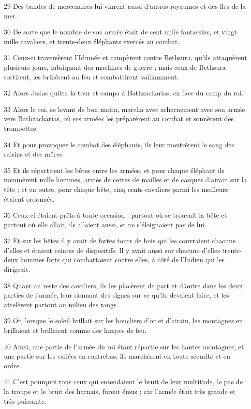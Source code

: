 \par 29 Des bandes de mercenaires lui vinrent aussi d'autres royaumes et des îles de la mer.
\par 30 De sorte que le nombre de son armée était de cent mille fantassins, et vingt mille cavaliers, et trente-deux éléphants exercés au combat.
\par 31 Ceux-ci traversèrent l'Idumée et campèrent contre Bethsura, qu'ils attaquèrent plusieurs jours, fabriquant des machines de guerre ; mais ceux de Bethsura sortirent, les brûlèrent au feu et combattirent vaillamment.
\par 32 Alors Judas quitta la tour et campa à Bathzacharias, en face du camp du roi.
\par 33 Alors le roi, se levant de bon matin, marcha avec acharnement avec son armée vers Bathzacharias, où ses armées les préparèrent au combat et sonnèrent des trompettes.
\par 34 Et pour provoquer le combat des éléphants, ils leur montrèrent le sang des raisins et des mûres.
\par 35 Et ils répartirent les bêtes entre les armées, et pour chaque éléphant ils nommèrent mille hommes, armés de cottes de mailles et de casques d'airain sur la tête ; et en outre, pour chaque bête, cinq cents cavaliers parmi les meilleurs étaient ordonnés.
\par 36 Ceux-ci étaient prêts à toute occasion : partout où se trouvait la bête et partout où elle allait, ils allaient aussi, et ne s'éloignaient pas de lui.
\par 37 Et sur les bêtes il y avait de fortes tours de bois qui les couvraient chacune d'elles et étaient ceintes de dispositifs. Il y avait aussi sur chacune d'elles trente-deux hommes forts qui combattaient contre elles, à côté de l'Indien qui les dirigeait.
\par 38 Quant au reste des cavaliers, ils les placèrent de part et d'autre dans les deux parties de l'armée, leur donnant des signes sur ce qu'ils devaient faire, et les attelèrent partout au milieu des rangs.
\par 39 Or, lorsque le soleil brillait sur les boucliers d'or et d'airain, les montagnes en brillaient et brillaient comme des lampes de feu.
\par 40 Ainsi, une partie de l'armée du roi étant répartie sur les hautes montagnes, et une partie sur les vallées en contrebas, ils marchèrent en toute sécurité et en ordre.
\par 41 C'est pourquoi tous ceux qui entendaient le bruit de leur multitude, le pas de la troupe et le bruit des harnais, furent émus ; car l'armée était très grande et très puissante.
